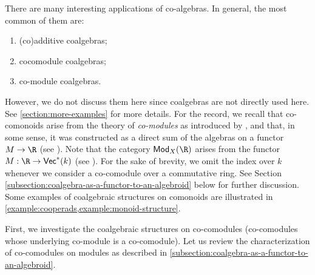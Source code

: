 \documentclass[a4paper,reqno,oneside]{article}
\begin{document}
There are many interesting applications of co-algebras.  In general, the most common of them are:
\begin{enumerate}
    \item (co)additive coalgebras;
    \item cocomodule coalgebras;
    \item co-module coalgebras.
\end{enumerate}
However, we do not discuss them here since coalgebras are not directly used here.  See \cref{section:more-examples} for more details.  For the record, we recall that co-comonoids arise from the theory of \emph{co-modules} as introduced by \cite{GarnerLack}, and that, in some sense, it was constructed as a direct sum of the algebras on a functor $M \to \R$ (see \cite[Def 2.3]{GarnerLack}).  Note that the category $\mathsf{Mod}_X(\R)$ arises from the functor $M : \R \to \mathsf{Vec}^*(k)$ (see \cite{BourkeBook}).  For the sake of brevity, we omit the index over $k$ whenever we consider a co-comodule over a commutative ring.  See Section \ref{subsection:coalgebra-as-a-functor-to-an-algebroid} below for further discussion.  Some examples of coalgebraic structures on comonoids are illustrated in \cref{example:cooperads,example:monoid-structure}.


First, we investigate the coalgebraic structures on co-comodules (co-comodules whose underlying co-module is a co-comodule).  Let us review the characterization of co-comodules on modules as described in \cref{subsection:coalgebra-as-a-functor-to-an-algebroid}.
\end{document}
